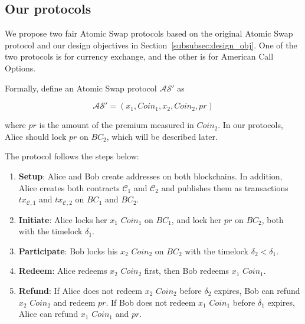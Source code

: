 \subsection{Our protocols}
We propose two fair Atomic Swap protocols based on the original Atomic Swap protocol and our design objectives in Section~\ref{subsubsec:design_obj}.
One of the two protocols is for currency exchange, and the other is for American Call Options.

Formally, define an Atomic Swap protocol $\mathcal{AS}'$ as

$$\mathcal{AS}' = (x_1, Coin_1, x_2, Coin_2, pr)$$

where $pr$ is the amount of the premium measured in $Coin_2$.
In our protocols, Alice should lock $pr$ on $BC_2$, which will be described later.

The protocol follows the steps below:
\begin{enumerate}
    \item \textbf{Setup}: Alice and Bob create addresses on both blockchains.
    In addition, Alice creates both contracts $\mathcal{C}_1$ and $\mathcal{C}_2$ and publishes them as transactions $tx_{\mathcal{C}, 1}$ and $tx_{\mathcal{C}, 2}$ on $BC_1$ and $BC_2$. 
    \item \textbf{Initiate}: Alice locks her $x_1$ $Coin_1$ on $BC_1$, and lock her $pr$ on $BC_2$, both with the timelock $\delta_1$.
    \item \textbf{Participate}: Bob locks his $x_2$ $Coin_2$ on $BC_2$ with the timelock $\delta_2 < \delta_1$.
    \item \textbf{Redeem}: Alice redeems $x_2$ $Coin_2$ first, then Bob redeems $x_1$ $Coin_1$.
    \item \textbf{Refund}: If Alice does not redeem $x_2$ $Coin_2$ before $\delta_2$ expires, Bob can refund $x_2$ $Coin_2$ and redeem $pr$.
    If Bob does not redeem $x_1$ $Coin_1$ before $\delta_1$ expires, Alice can refund $x_1$ $Coin_1$ and $pr$.
\end{enumerate}

